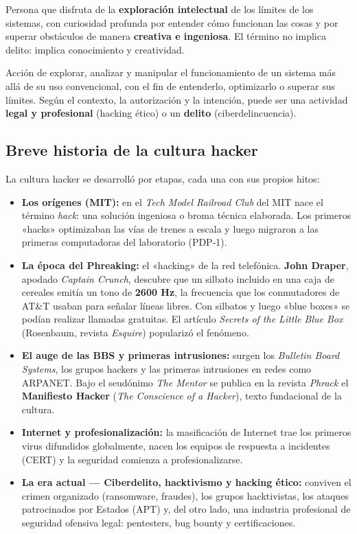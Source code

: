 \documentclass[11pt,a4paper]{article}
\begin{document}
\begin{definicion}
Persona que disfruta de la \textbf{exploración intelectual} de los límites de los sistemas, con curiosidad profunda por entender cómo funcionan las cosas y por superar obstáculos de manera \textbf{creativa e ingeniosa}. El término no implica delito: implica conocimiento y creatividad.
\end{definicion}

\begin{definicion}[Hacking]
Acción de explorar, analizar y manipular el funcionamiento de un sistema más allá de su uso convencional, con el fin de entenderlo, optimizarlo o superar sus límites. Según el contexto, la autorización y la intención, puede ser una actividad \textbf{legal y profesional} (hacking ético) o un \textbf{delito} (ciberdelincuencia).
\end{definicion}

\subsection{Breve historia de la cultura hacker}
La cultura hacker se desarrolló por etapas, cada una con sus propios hitos:

\begin{itemize}[leftmargin=*]
  \item \textbf{Los orígenes (MIT):} en el \textit{Tech Model Railroad Club} del MIT nace el término \textit{hack}: una solución ingeniosa o broma técnica elaborada. Los primeros «hacks» optimizaban las vías de trenes a escala y luego migraron a las primeras computadoras del laboratorio (PDP-1).
  \item \textbf{La época del Phreaking:} el «hacking» de la red telefónica. \textbf{John Draper}, apodado \textit{Captain Crunch}, descubre que un silbato incluido en una caja de cereales emitía un tono de \textbf{2600 Hz}, la frecuencia que los conmutadores de AT\&T usaban para señalar líneas libres. Con silbatos y luego «blue boxes» se podían realizar llamadas gratuitas. El artículo \textit{Secrets of the Little Blue Box} (Rosenbaum, revista \textit{Esquire}) popularizó el fenómeno.
  \item \textbf{El auge de las BBS y primeras intrusiones:} surgen los \textit{Bulletin Board Systems}, los grupos hackers y las primeras intrusiones en redes como ARPANET. Bajo el seudónimo \textit{The Mentor} se publica en la revista \textit{Phrack} el \textbf{Manifiesto Hacker} (\textit{The Conscience of a Hacker}), texto fundacional de la cultura.
  \item \textbf{Internet y profesionalización:} la masificación de Internet trae los primeros virus difundidos globalmente, nacen los equipos de respuesta a incidentes (CERT) y la seguridad comienza a profesionalizarse.
  \item \textbf{La era actual --- Ciberdelito, hacktivismo y hacking ético:} conviven el crimen organizado (ransomware, fraudes), los grupos hacktivistas, los ataques patrocinados por Estados (APT) y, del otro lado, una industria profesional de seguridad ofensiva legal: pentesters, bug bounty y certificaciones.
\end{itemize}
\end{document}
